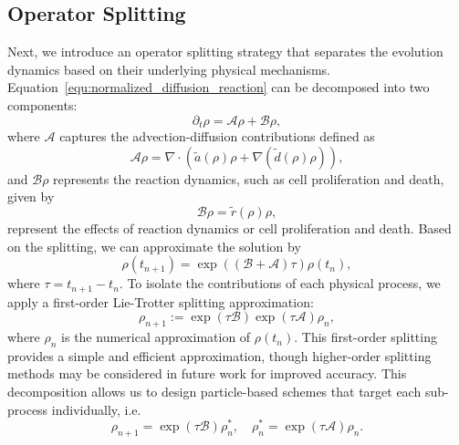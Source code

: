 \documentclass[12pt]{article}
\begin{document}
\subsection{Operator Splitting}
Next, we introduce an operator splitting strategy that separates the evolution dynamics based on their underlying physical mechanisms. 
Equation~\eqref{equ:normalized_diffusion_reaction} can be decomposed into two components:
\begin{equation}
\partial_t \rho  = \mathcal A \rho + \mathcal B \rho ,
\end{equation}
where $\mathcal A$ captures the advection-diffusion contributions defined as 
\begin{equation}
 \mathcal A \rho =  \nabla \cdot \left( \tilde a(\rho)\rho + \nabla (\tilde d(\rho) \rho) \right),
\end{equation}
and $\mathcal B\rho$ represents the reaction dynamics, such as cell proliferation and death, given by
\begin{equation}
\mathcal B \rho = \tilde r(\rho)\rho,
\end{equation}
represent the effects of reaction dynamics or cell proliferation and death.
Based on the splitting, we can approximate the solution by 
\begin{equation}
    \rho(t_{n+1})=  \exp\left((\mathcal B+\mathcal A)\tau \right)\rho(t_{n}),
\end{equation}
where $\tau = t_{n+1}-t_n$.
To isolate the contributions of each physical process, we apply a first-order Lie-Trotter splitting approximation:
\begin{equation}
\rho_{n+1} :=\exp(\tau \mathcal B)\exp(\tau \mathcal A)\rho_n,
\end{equation}
where $\rho_n$ is the numerical approximation of $\rho(t_{n})$. 
This first-order splitting provides a simple and efficient approximation, though higher-order splitting methods may be considered in future work for improved accuracy. This decomposition allows us to design particle-based schemes that target each sub-process individually, i.e.
\begin{equation}
\rho_{n+1} =\exp(\tau \mathcal B)\rho^*_n, \quad \rho^*_n = \exp(\tau \mathcal A)\rho_n.
\end{equation}
\end{document}
